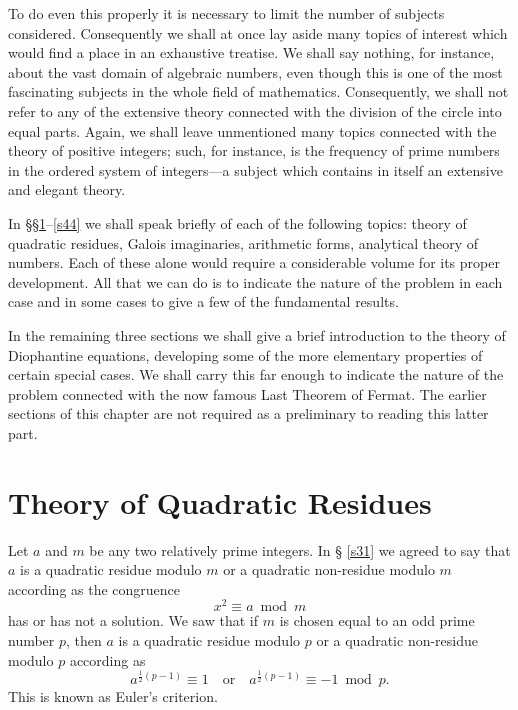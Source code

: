 \documentclass[oneside]{book}
\begin{document}
To do even this properly it is necessary to limit the number of
subjects considered. Consequently we shall at once lay aside many
topics of interest which would find a place in an exhaustive
treatise. We shall say nothing, for instance, about the vast domain
of algebraic numbers, even though this is one of the most
fascinating subjects in the whole field of
mathematics. Consequently, we shall not
refer to any of the extensive theory connected with the division of
the circle into equal parts. Again, we
shall leave unmentioned many topics connected with the theory of
positive integers; such, for instance, is the frequency of prime
numbers in the ordered system of integers---a subject which contains
in itself an extensive and elegant theory.

In \S\S \ref{s41}--\ref{s44} we shall speak briefly of each of the
following topics: theory of quadratic residues, Galois imaginaries,
arithmetic forms, analytical theory of numbers. Each of these alone
would require a considerable volume for its proper development. All
that we can do is to indicate the nature of the problem in each case
and in some cases to give a few of the fundamental results.

In the remaining three sections we shall give a brief introduction
to the theory of Diophantine equations, developing some of the more
elementary properties of certain special cases. We shall carry this
far enough to indicate the nature of the problem connected with the
now famous Last Theorem of Fermat. The earlier sections of this
chapter are not required as a preliminary to reading this latter
part.

\section{Theory of Quadratic Residues}\label{s41}%

Let $a$ and $m$ be any two relatively prime integers. In \S
\ref{s31} we agreed to say that $a$ is a quadratic residue modulo
$m$ or a quadratic non-residue modulo $m$ according as the
congruence
\begin{equation*}
x^2 \equiv a \bmod m
\end{equation*}
has or has not a solution. We saw that if $m$ is chosen equal to an
odd prime number $p$, then $a$ is a quadratic residue modulo $p$ or
a quadratic non-residue modulo $p$ according as
\begin{equation*}
a^{\frac{1}{2} (p-1)} \equiv 1\quad \mathrm{or}\quad
  a^{\frac{1}{2} (p-1)} \equiv -1 \bmod p.
\end{equation*}
This is known as Euler's criterion.
\end{document}
